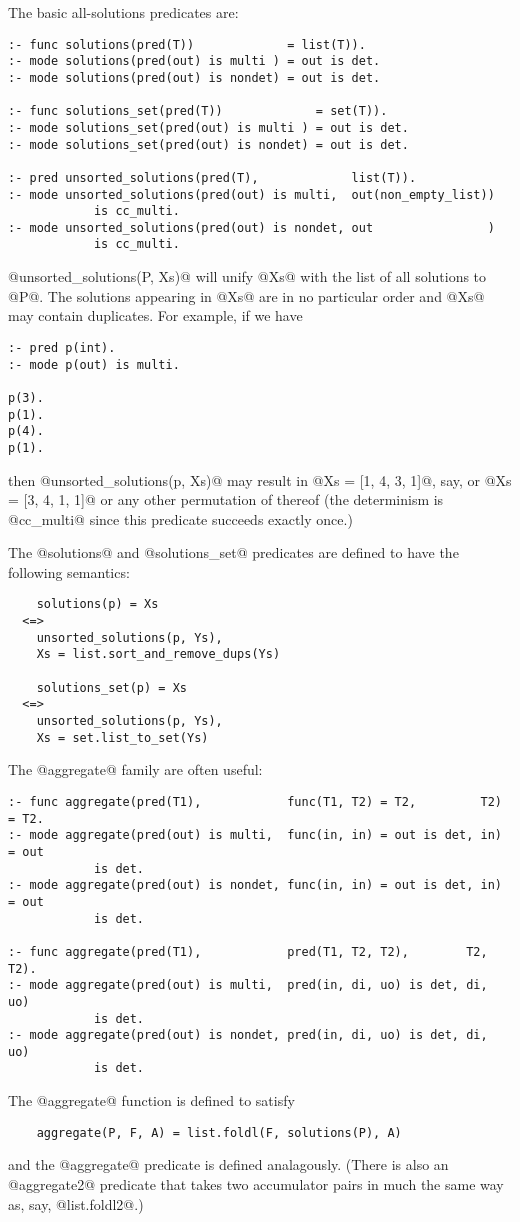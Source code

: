 The basic all-solutions predicates are:
\begin{verbatim}
:- func solutions(pred(T))             = list(T)).
:- mode solutions(pred(out) is multi ) = out is det.
:- mode solutions(pred(out) is nondet) = out is det.

:- func solutions_set(pred(T))             = set(T)).
:- mode solutions_set(pred(out) is multi ) = out is det.
:- mode solutions_set(pred(out) is nondet) = out is det.

:- pred unsorted_solutions(pred(T),             list(T)).
:- mode unsorted_solutions(pred(out) is multi,  out(non_empty_list))
            is cc_multi.
:- mode unsorted_solutions(pred(out) is nondet, out                )
            is cc_multi.
\end{verbatim}
@unsorted\_solutions(P, Xs)@ will unify @Xs@ with the list of all
solutions to @P@.  The solutions appearing in @Xs@ are in no particular
order and @Xs@ may contain duplicates.  For example, if we have
\begin{verbatim}
:- pred p(int).
:- mode p(out) is multi.

p(3).
p(1).
p(4).
p(1).
\end{verbatim}
then @unsorted_solutions(p, Xs)@ may result in @Xs = [1, 4, 3, 1]@, say,
or @Xs = [3, 4, 1, 1]@ or any other permutation of thereof (the
determinism is @cc\_multi@ since this predicate succeeds exactly once.)

The @solutions@ and @solutions\_set@ predicates are defined to have the
following semantics:
\begin{verbatim}
    solutions(p) = Xs
  <=>
    unsorted_solutions(p, Ys),
    Xs = list.sort_and_remove_dups(Ys)

    solutions_set(p) = Xs
  <=>
    unsorted_solutions(p, Ys),
    Xs = set.list_to_set(Ys)
\end{verbatim}

The @aggregate@ family are often useful:
\begin{verbatim}
:- func aggregate(pred(T1),            func(T1, T2) = T2,         T2) = T2.
:- mode aggregate(pred(out) is multi,  func(in, in) = out is det, in) = out
            is det.
:- mode aggregate(pred(out) is nondet, func(in, in) = out is det, in) = out
            is det.

:- func aggregate(pred(T1),            pred(T1, T2, T2),        T2, T2).
:- mode aggregate(pred(out) is multi,  pred(in, di, uo) is det, di, uo)
            is det.
:- mode aggregate(pred(out) is nondet, pred(in, di, uo) is det, di, uo)
            is det.
\end{verbatim}
The @aggregate@ function is defined to satisfy
\begin{verbatim}
    aggregate(P, F, A) = list.foldl(F, solutions(P), A)
\end{verbatim}
and the @aggregate@ predicate is defined analagously.
(There is also an @aggregate2@ predicate that takes two accumulator
pairs in much the same way as, say, @list.foldl2@.)

